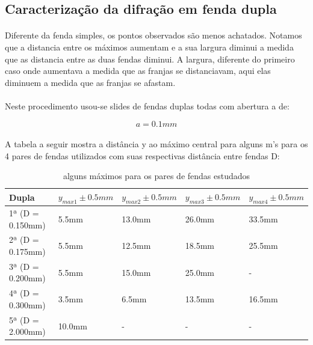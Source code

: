 \documentclass[a4paper,11pt]{article}
\begin{document}
\subsection{Caracterização da difração em fenda dupla}
\paragraph{}
Diferente da fenda simples, os pontos observados são menos
achatados. Notamos que a distancia entre os máximos aumentam
e a sua largura diminui a medida que as distancia entre as
duas fendas diminui. A largura, diferente do primeiro caso
onde aumentava a medida que as franjas se distanciavam, aqui
elas diminuem a medida que as franjas se afastam. 

\paragraph{}Neste procedimento usou-se slides de fendas duplas todas
com abertura a de:

\begin{displaymath}
	a = 0.1 mm
\end{displaymath}

\paragraph{}A tabela a seguir mostra a distância y
ao máximo central para alguns m's para os 4 pares de fendas
utilizados com suas respectivas distância entre fendas D:

 \begin{table}[!htp]
    \centering
    \begin{tabular}{|l|l|l|l|l|}\hline
	Dupla	& $y_{max 1} \pm 0.5mm$ &  $y_{max 2}
\pm 0.5mm$ & $y_{max 3} \pm 0.5mm$ & $y_{max 4} \pm 0.5mm$ \\ \hline
      	1ª (D = 0.150mm) &5.5mm &13.0mm &26.0mm & 33.5mm \\ \hline
      	2ª (D = 0.175mm) &5.5mm &12.5mm & 18.5mm &25.5mm \\ \hline
      	3ª (D = 0.200mm) &5.5mm &15.0mm & 25.0mm & - \\ \hline
	4ª (D = 0.300mm) &3.5mm &6.5mm &13.5mm & 16.5mm \\ \hline
	5ª (D = 2.000mm) &10.0mm &- &- &- \\ \hline
\end{tabular}
\caption{alguns máximos para os pares de fendas estudados}
\label{tab:fendas-multiplas}
\end{table}
\end{document}
